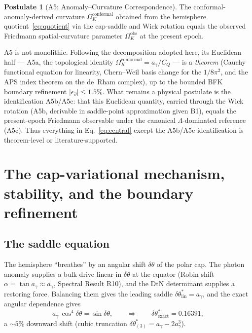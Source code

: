 \documentclass[11pt,a4paper]{article}
\theoremstyle{plain}
\theoremstyle{definition}
\newtheorem{postulate}{Postulate}
\theoremstyle{remark}
\newcommand{\Ok}{\Omega_K}
\newcommand{\ag}{a_\gamma}
\newcommand{\CQ}{C_Q}
\newcommand{\dtheta}{\delta\theta}
\begin{document}
\begin{postulate}[A5: Anomaly--Curvature Correspondence]
The conformal-anomaly-derived curvature $\Ok^{\mathrm{conformal}}$ obtained from the hemisphere
quotient~\eqref{eq:quotient} via the cap-saddle and Wick rotation equals the observed Friedmann
spatial-curvature parameter $\Ok^{\mathrm{obs}}$ at the present epoch.
\end{postulate}
\noindent
A5 is not monolithic. Following the decomposition adopted here, its
Euclidean half --- A5a, the topological identity $\Ok^{\mathrm{conformal}} = \ag/\CQ$ --- is a
\emph{theorem} (Cauchy functional equation for linearity, Chern--Weil basis change for the
$1/8\pi^2$, and the APS index theorem on the de~Rham complex), up to the bounded BFK boundary
refinement $|\epsilon_\partial| \le 1.5\%$. What remains a physical postulate is the
identification A5b/A5c: that this Euclidean quantity, carried through the Wick rotation (A5b,
derivable in saddle-point approximation given B1), equals the present-epoch Friedmann observable
under the canonical $\Lambda$-dominated reference (A5c). Thus everything in
Eq.~\eqref{eq:central} except the A5b/A5c identification is theorem-level or literature-supported.

\section{The cap-variational mechanism, stability, and the boundary refinement}
\label{sec:cap}

\subsection{The saddle equation}
The hemisphere ``breathes'' by an angular shift $\dtheta$ of the polar cap. The photon anomaly
supplies a bulk drive linear in $\dtheta$ at the equator (Robin shift $\alpha = \tan\ag \approx
\ag$, Spectral Result R10), and the DtN determinant supplies a restoring force. Balancing them
gives the leading saddle $\dtheta^*_{\mathrm{lin}} = \ag$, and the exact angular dependence gives
\begin{equation}
\label{eq:saddle}
\ag\,\cos^4\dtheta = \sin\dtheta,
\qquad\Longrightarrow\qquad
\dtheta^*_{\mathrm{exact}} = 0.16391 ,
\end{equation}
a $\sim 5\%$ downward shift (cubic truncation $\dtheta^*_{(3)} = \ag - 2\ag^3$).
\end{document}
